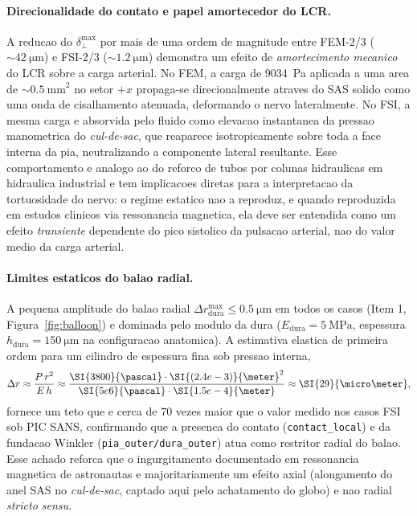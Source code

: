 \paragraph{Direcionalidade do contato e papel amortecedor do LCR.} A reducao do $\delta_{\perp}^{\max}$ por mais de uma ordem de magnitude entre FEM-2/3 ($\sim \SI{42}{\micro\meter}$) e FSI-2/3 ($\sim \SI{1.2}{\micro\meter}$) demonstra um efeito de \emph{amortecimento mecanico} do LCR sobre a carga arterial. No FEM, a carga de \SI{9034}{\pascal} aplicada a uma area de $\sim \SI{0.5}{\milli\meter}^2$ no setor $+x$ propaga-se direcionalmente atraves do SAS solido como uma onda de cisalhamento atenuada, deformando o nervo lateralmente. No FSI, a mesma carga e absorvida pelo fluido como elevacao instantanea da pressao manometrica do \emph{cul-de-sac}, que reaparece isotropicamente sobre toda a face interna da pia, neutralizando a componente lateral resultante. Esse comportamento e analogo ao do reforco de tubos por colunas hidraulicas em hidraulica industrial e tem implicacoes diretas para a interpretacao da tortuosidade do nervo: o regime estatico nao a reproduz, e quando reproduzida em estudos clinicos via ressonancia magnetica, ela deve ser entendida como um efeito \emph{transiente} dependente do pico sistolico da pulsacao arterial, nao do valor medio da carga arterial.

\paragraph{Limites estaticos do balao radial.} A pequena amplitude do balao radial $\Delta r_{\mathrm{dura}}^{\max} \le \SI{0.5}{\micro\meter}$ em todos os casos (Item 1, Figura~\ref{fig:balloon}) e dominada pelo modulo da dura ($E_{\mathrm{dura}} = \SI{5}{\mega\pascal}$, espessura $h_{\mathrm{dura}} = \SI{150}{\micro\meter}$ na configuracao anatomica). A estimativa elastica de primeira ordem para um cilindro de espessura fina sob pressao interna,
\begin{equation}
  \Delta r \approx \frac{P\, r^2}{E\, h} \approx \frac{\SI{3800}{\pascal} \cdot \SI{(2.4e-3)}{\meter}^2}{\SI{5e6}{\pascal} \cdot \SI{1.5e-4}{\meter}} \approx \SI{29}{\micro\meter},
  \label{eq:balao-1order}
\end{equation}
fornece um teto que e cerca de 70 vezes maior que o valor medido nos casos FSI sob PIC SANS, confirmando que a presenca do contato (\texttt{contact\_local}) e da fundacao Winkler (\texttt{pia\_outer/dura\_outer}) atua como restritor radial do balao. Esse achado reforca que o ingurgitamento documentado em ressonancia magnetica de astronautas e majoritariamente um efeito axial (alongamento do anel SAS no \emph{cul-de-sac}, captado aqui pelo achatamento do globo) e nao radial \emph{stricto sensu}.

